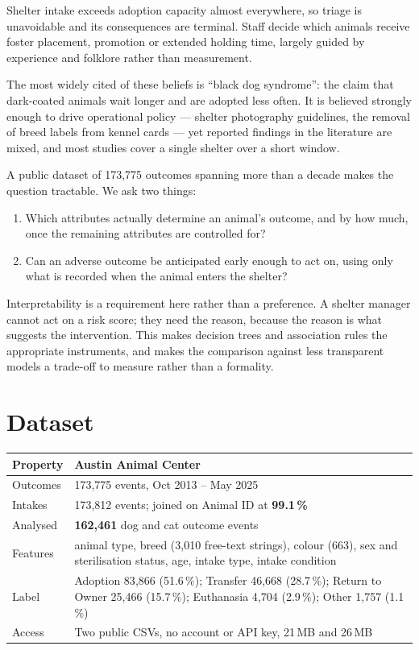 \documentclass[11pt,a4paper]{article}
\begin{document}
Shelter intake exceeds adoption capacity almost everywhere, so triage is
unavoidable and its consequences are terminal. Staff decide which animals
receive foster placement, promotion or extended holding time, largely guided by
experience and folklore rather than measurement.

The most widely cited of these beliefs is ``black dog syndrome'': the claim that
dark-coated animals wait longer and are adopted less often. It is believed
strongly enough to drive operational policy --- shelter photography guidelines,
the removal of breed labels from kennel cards --- yet reported findings in the
literature are mixed, and most studies cover a single shelter over a short
window.

A public dataset of 173{,}775 outcomes spanning more than a decade makes the
question tractable. We ask two things:

\begin{enumerate}[label=\textbf{Q\arabic*.}]
  \item Which attributes actually determine an animal's outcome, and by how
        much, once the remaining attributes are controlled for?
  \item Can an adverse outcome be anticipated early enough to act on, using only
        what is recorded when the animal enters the shelter?
\end{enumerate}

Interpretability is a requirement here rather than a preference. A shelter
manager cannot act on a risk score; they need the reason, because the reason is
what suggests the intervention. This makes decision trees and association rules
the appropriate instruments, and makes the comparison against less transparent
models a trade-off to measure rather than a formality.

\section{Dataset}

\begin{center}
\begin{tabular}{@{}L{3.3cm}L{12.0cm}@{}}
\toprule
\textbf{Property} & \textbf{Austin Animal Center} \\
\midrule
Outcomes & 173{,}775 events, Oct 2013 -- May 2025 \\
Intakes & 173{,}812 events; joined on Animal ID at \textbf{99.1\,\%} \\
Analysed & \textbf{162{,}461} dog and cat outcome events \\
Features & animal type, breed (3{,}010 free-text strings), colour (663), sex and
sterilisation status, age, intake type, intake condition \\
Label & Adoption 83{,}866 (51.6\,\%); Transfer 46{,}668 (28.7\,\%); Return to
Owner 25{,}466 (15.7\,\%); Euthanasia 4{,}704 (2.9\,\%); Other 1{,}757 (1.1\,\%) \\
Access & Two public CSVs, no account or API key, 21\,MB and 26\,MB \\
\bottomrule
\end{tabular}
\end{center}
\end{document}
